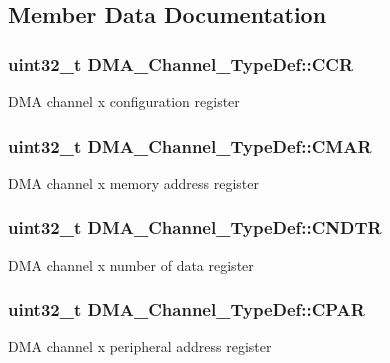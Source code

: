 \subsection{Member Data Documentation}
\hypertarget{struct_d_m_a___channel___type_def_aa4938d438293f76ff6d9a262715c23eb}{
\subsubsection[{C\-C\-R}]{ uint32\-\_\-t D\-M\-A\-\_\-\-Channel\-\_\-\-Type\-Def\-::\-C\-C\-R}}\label{struct_d_m_a___channel___type_def_aa4938d438293f76ff6d9a262715c23eb}
D\-M\-A channel x configuration register \hypertarget{struct_d_m_a___channel___type_def_a7a9886b5f9e0edaf5ced3d1870b33ad7}{
\subsubsection[{C\-M\-A\-R}]{ uint32\-\_\-t D\-M\-A\-\_\-\-Channel\-\_\-\-Type\-Def\-::\-C\-M\-A\-R}}\label{struct_d_m_a___channel___type_def_a7a9886b5f9e0edaf5ced3d1870b33ad7}
D\-M\-A channel x memory address register \hypertarget{struct_d_m_a___channel___type_def_af1c675e412fb96e38b6b4630b88c5676}{
\subsubsection[{C\-N\-D\-T\-R}]{ uint32\-\_\-t D\-M\-A\-\_\-\-Channel\-\_\-\-Type\-Def\-::\-C\-N\-D\-T\-R}}\label{struct_d_m_a___channel___type_def_af1c675e412fb96e38b6b4630b88c5676}
D\-M\-A channel x number of data register \hypertarget{struct_d_m_a___channel___type_def_a8ce1c9c2742eaaa0e97ddbb3a06154cc}{
\subsubsection[{C\-P\-A\-R}]{ uint32\-\_\-t D\-M\-A\-\_\-\-Channel\-\_\-\-Type\-Def\-::\-C\-P\-A\-R}}\label{struct_d_m_a___channel___type_def_a8ce1c9c2742eaaa0e97ddbb3a06154cc}
D\-M\-A channel x peripheral address register 

